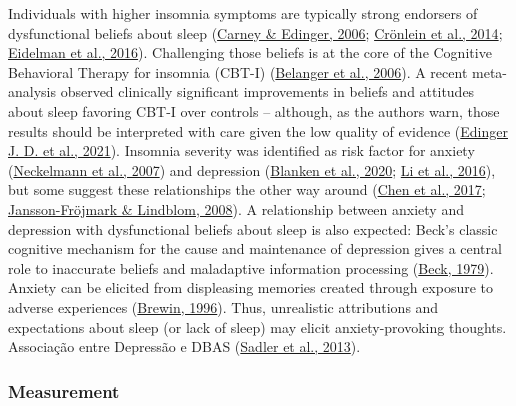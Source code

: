 \documentclass[
  ,doc,11pt, twoside,floatsintext]{apa6}
\begin{document}
Individuals with higher insomnia symptoms are typically strong endorsers of dysfunctional beliefs about sleep (\protect\hyperlink{ref-carney2006}{Carney \& Edinger, 2006}; \protect\hyperlink{ref-cronlein2014}{Crönlein et al., 2014}; \protect\hyperlink{ref-eidelman2016}{Eidelman et al., 2016}). Challenging those beliefs is at the core of the Cognitive Behavioral Therapy for insomnia (CBT-I) (\protect\hyperlink{ref-belanger2006}{Belanger et al., 2006}). A recent meta-analysis observed clinically significant improvements in beliefs and attitudes about sleep favoring CBT-I over controls -- although, as the authors warn, those results should be interpreted with care given the low quality of evidence (\protect\hyperlink{ref-edingerjackd.2021}{Edinger J. D. et al., 2021}). Insomnia severity was identified as risk factor for anxiety (\protect\hyperlink{ref-neckelmann2007}{Neckelmann et al., 2007}) and depression (\protect\hyperlink{ref-blanken2020}{Blanken et al., 2020}; \protect\hyperlink{ref-li2016}{Li et al., 2016}), but some suggest these relationships the other way around (\protect\hyperlink{ref-chen2017}{Chen et al., 2017}; \protect\hyperlink{ref-jansson-frojmark2008b}{Jansson-Fröjmark \& Lindblom, 2008}). A relationship between anxiety and depression with dysfunctional beliefs about sleep is also expected: Beck's classic cognitive mechanism for the cause and maintenance of depression gives a central role to inaccurate beliefs and maladaptive information processing (\protect\hyperlink{ref-beck1979cognitive}{Beck, 1979}). Anxiety can be elicited from displeasing memories created through exposure to adverse experiences (\protect\hyperlink{ref-brewin1996theoretical}{Brewin, 1996}). Thus, unrealistic attributions and expectations about sleep (or lack of sleep) may elicit anxiety-provoking thoughts. Associação entre Depressão e DBAS (\protect\hyperlink{ref-sadler2013}{Sadler et al., 2013}).

\hypertarget{measurement}{%
\subsubsection{Measurement}\label{measurement}}
\end{document}
